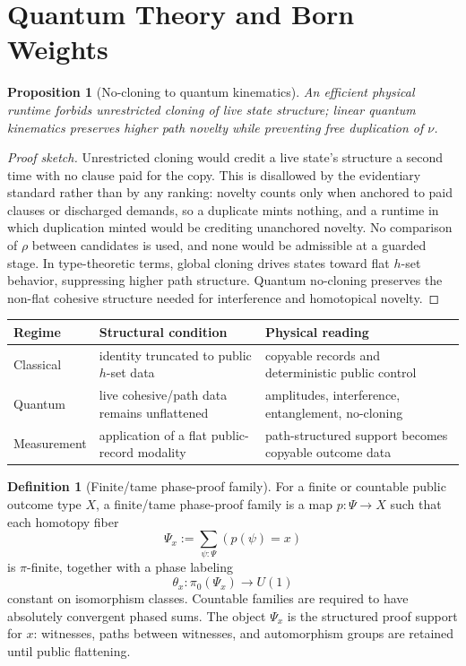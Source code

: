 \documentclass[11pt]{article}
\theoremstyle{plain}
\newtheorem{proposition}[theorem]{Proposition}
\theoremstyle{definition}
\newtheorem{definition}[theorem]{Definition}
\theoremstyle{remark}
\newenvironment{proofsketch}{\begin{proof}[Proof sketch]}{\end{proof}}
\begin{document}
\section{Quantum Theory and Born Weights}

\begin{proposition}[No-cloning to quantum kinematics]
An efficient physical runtime forbids unrestricted cloning of live state structure; linear quantum kinematics preserves higher path novelty while preventing free duplication of \(\nu\).
\end{proposition}

\begin{proofsketch}
Unrestricted cloning would credit a live state's structure a second time with no clause paid for the copy. This is disallowed by the evidentiary standard rather than by any ranking: novelty counts only when anchored to paid clauses or discharged demands, so a duplicate mints nothing, and a runtime in which duplication minted would be crediting unanchored novelty. No comparison of \(\rho\) between candidates is used, and none would be admissible at a guarded stage. In type-theoretic terms, global cloning drives states toward flat \(h\)-set behavior, suppressing higher path structure. Quantum no-cloning preserves the non-flat cohesive structure needed for interference and homotopical novelty.
\end{proofsketch}

\begin{center}
\small
\begin{tabularx}{\textwidth}{l Y Y}
\toprule
Regime & Structural condition & Physical reading \\
\midrule
Classical & identity truncated to public \(h\)-set data & copyable records and deterministic public control \\
Quantum & live cohesive/path data remains unflattened & amplitudes, interference, entanglement, no-cloning \\
Measurement & application of a flat public-record modality & path-structured support becomes copyable outcome data \\
\bottomrule
\end{tabularx}
\end{center}

\begin{definition}[Finite/tame phase-proof family]
For a finite or countable public outcome type \(X\), a finite/tame phase-proof family is a map \(p:\Psi\to X\) such that each homotopy fiber
\[
\Psi_x:=\sum_{\psi:\Psi}(p(\psi)=x)
\]
is \(\pi\)-finite, together with a phase labeling
\[
\theta_x:\pi_0(\Psi_x)\to U(1)
\]
constant on isomorphism classes. Countable families are required to have absolutely convergent phased sums. The object \(\Psi_x\) is the structured proof support for \(x\): witnesses, paths between witnesses, and automorphism groups are retained until public flattening.
\end{definition}
\end{document}
